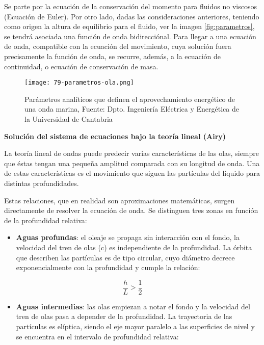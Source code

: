 Se parte por la ecuación de la conservación del momento para fluidos no
viscosos (Ecuación de Euler). Por otro lado, dadas las consideraciones
anteriores, teniendo como origen la altura de equilibrio para el fluido, ver la imagen \autoref{fig:parametros},
se tendrá asociada una función de onda bidirecciónal. Para llegar a una
ecuación de onda, compatible con la ecuación del movimiento, cuya
solución fuera precisamente la función de onda, se recurre, además, a la
ecuación de continuidad, o ecuación de conservación de masa.

\begin{figure}
\centering
\texttt{[image: 79-parametros-ola.png]}
\caption[Parámetros de una ola]{Parámetros analíticos que definen el aprovechamiento energético de una onda marina, Fuente: Dpto. Ingeniería Eléctrica y
Energética de la Universidad de Cantabria}
\label{fig:parametros}
\end{figure}

\textbf{Solución del sistema de ecuaciones bajo la teoría
lineal (Airy)}

La teoría lineal de ondas puede predecir varias características de las
olas, siempre que éstas tengan una pequeña amplitud comparada con su
longitud de onda. Una de estas características es el movimiento que
siguen las partículas del líquido para distintas profundidades.

Estas relaciones, que en realidad son aproximaciones matemáticas, surgen
directamente de resolver la ecuación de onda. Se distinguen tres zonas
en función de la profundidad relativa:

\begin{itemize}
\item
  \textbf{Aguas profundas}: el oleaje se propaga sin interacción con el
  fondo, la velocidad del tren de olas (c) es independiente de la
  profundidad. La órbita que describen las partículas es de tipo
  circular, cuyo diámetro decrece exponencialmente con la profundidad y
  cumple la relación:
\end{itemize}

\[\frac{h}{L}>\frac{1}{2}\]

\begin{itemize}
\item
  \textbf{Aguas intermedias}: las olas empiezan a notar el fondo y la
  velocidad del tren de olas pasa a depender de la profundidad. La
  trayectoria de las partículas es elíptica, siendo el eje mayor
  paralelo a las superficies de nivel y se encuentra en el intervalo de
  profundidad relativa:
\end{itemize}


